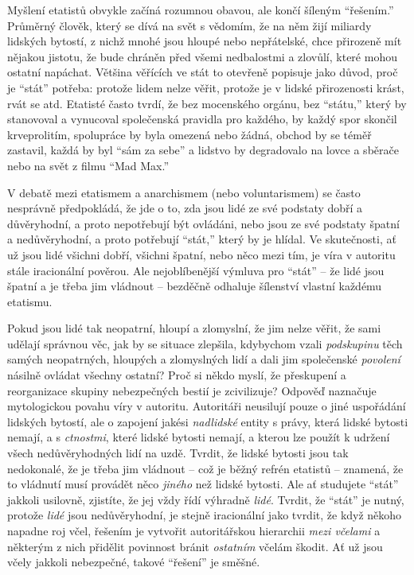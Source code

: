 \documentclass{book}
\begin{document}
Myšlení etatistů obvykle začíná rozumnou obavou, ale končí šíleným \enquote{řešením.} Průměrný člověk, který se dívá na svět s vědomím, že na něm žijí miliardy lidských bytostí, z nichž mnohé jsou hloupé nebo nepřátelské, chce přirozeně mít nějakou jistotu, že bude chráněn před všemi nedbalostmi a zlovůlí, které mohou ostatní napáchat. Většina věřících ve stát to otevřeně popisuje jako důvod, proč je \enquote{stát} potřeba: protože lidem nelze věřit, protože je v lidské přirozenosti krást, rvát se atd. Etatisté často tvrdí, že bez mocenského orgánu, bez \enquote{státu,} který by stanovoval a vynucoval společenská pravidla pro každého, by každý spor skončil krveprolitím, spolupráce by byla omezená nebo žádná, obchod by se téměř zastavil, každá by byl \enquote{sám za sebe} a lidstvo by degradovalo na lovce a sběrače nebo na svět z filmu \enquote{Mad Max.}

V debatě mezi etatismem a anarchismem (nebo voluntarismem) se často nesprávně předpokládá, že jde o to, zda jsou lidé ze své podstaty dobří a důvěryhodní, a proto nepotřebují být ovládáni, nebo jsou ze své podstaty špatní a nedůvěryhodní, a proto potřebují \enquote{stát,} který by je hlídal. Ve skutečnosti, ať už jsou lidé všichni dobří, všichni špatní, nebo něco mezi tím, je víra v autoritu stále iracionální pověrou. Ale nejoblíbenější výmluva pro \enquote{stát} -- že lidé jsou špatní a je třeba jim vládnout -- bezděčně odhaluje šílenství vlastní každému etatismu.

Pokud jsou lidé tak neopatrní, hloupí a zlomyslní, že jim nelze věřit, že sami udělají správnou věc, jak by se situace zlepšila, kdybychom vzali \emph{podskupinu} těch samých neopatrných, hloupých a zlomyslných lidí a dali jim společenské \emph{povolení} násilně ovládat všechny ostatní? Proč si někdo myslí, že přeskupení a reorganizace skupiny nebezpečných bestií je zcivilizuje? Odpověď naznačuje mytologickou povahu víry v autoritu. Autoritáři neusilují pouze o jiné uspořádání lidských bytostí, ale o zapojení jakési \emph{nadlidské} entity s právy, která lidské bytosti nemají, a s \emph{ctnostmi}, které lidské bytosti nemají, a kterou lze použít k udržení všech nedůvěryhodných lidí na uzdě. Tvrdit, že lidské bytosti jsou tak nedokonalé, že je třeba jim vládnout -- což je běžný refrén etatistů -- znamená, že to vládnutí musí provádět něco \emph{jiného} než lidské bytosti. Ale ať studujete \enquote{stát} jakkoli usilovně, zjistíte, že jej vždy řídí výhradně \emph{lidé}. Tvrdit, že \enquote{stát} je nutný, protože \emph{lidé} jsou nedůvěryhodní, je stejně iracionální jako tvrdit, že když někoho napadne roj včel, řešením je vytvořit autoritářskou hierarchii \emph{mezi včelami} a některým z nich přidělit povinnost bránit \emph{ostatním} včelám škodit. Ať už jsou včely jakkoli nebezpečné, takové \enquote{řešení} je směšné.
\end{document}

